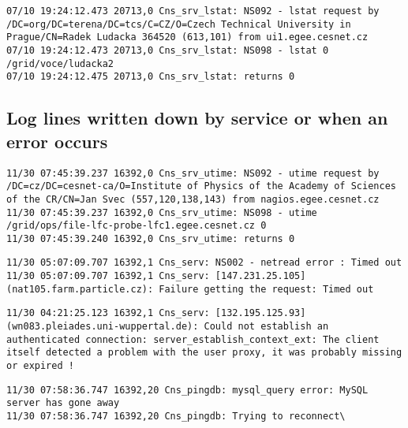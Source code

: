 \documentclass[a4paper, 11pt]{article} %
\begin{document}
\begin{lstlisting}[label={log:rm2},caption={lfc-rm /grid/voce/ludacka2 - error: Is a directory}]
07/10 19:24:12.473 20713,0 Cns_srv_lstat: NS092 - lstat request by /DC=org/DC=terena/DC=tcs/C=CZ/O=Czech Technical University in Prague/CN=Radek Ludacka 364520 (613,101) from ui1.egee.cesnet.cz
07/10 19:24:12.473 20713,0 Cns_srv_lstat: NS098 - lstat 0 /grid/voce/ludacka2
07/10 19:24:12.475 20713,0 Cns_srv_lstat: returns 0
\end{lstlisting}

\newpage

\subsection{Log lines written down by service or when an error occurs}

\begin{lstlisting}[label={log:utime},caption={Cns\_srv\_utime - invoked by nagios service}]
11/30 07:45:39.237 16392,0 Cns_srv_utime: NS092 - utime request by /DC=cz/DC=cesnet-ca/O=Institute of Physics of the Academy of Sciences of the CR/CN=Jan Svec (557,120,138,143) from nagios.egee.cesnet.cz
11/30 07:45:39.237 16392,0 Cns_srv_utime: NS098 - utime /grid/ops/file-lfc-probe-lfc1.egee.cesnet.cz 0
11/30 07:45:39.240 16392,0 Cns_srv_utime: returns 0
\end{lstlisting}

\begin{lstlisting}[label={log:timeout},caption={Cns\_serv - timed out}]
11/30 05:07:09.707 16392,1 Cns_serv: NS002 - netread error : Timed out
11/30 05:07:09.707 16392,1 Cns_serv: [147.231.25.105] (nat105.farm.particle.cz): Failure getting the request: Timed out
\end{lstlisting}

\begin{lstlisting}[label={log:proxyproblem},caption={Cns\_serv - proxy problem}]
11/30 04:21:25.123 16392,1 Cns_serv: [132.195.125.93] (wn083.pleiades.uni-wuppertal.de): Could not establish an authenticated connection: server_establish_context_ext: The client itself detected a problem with the user proxy, it was probably missing or expired !
\end{lstlisting}

\begin{lstlisting}[label={log:pingdb},caption={Cns\_pingdb - MySql query error}]
11/30 07:58:36.747 16392,20 Cns_pingdb: mysql_query error: MySQL server has gone away
11/30 07:58:36.747 16392,20 Cns_pingdb: Trying to reconnect\
\end{lstlisting}
\end{document}
